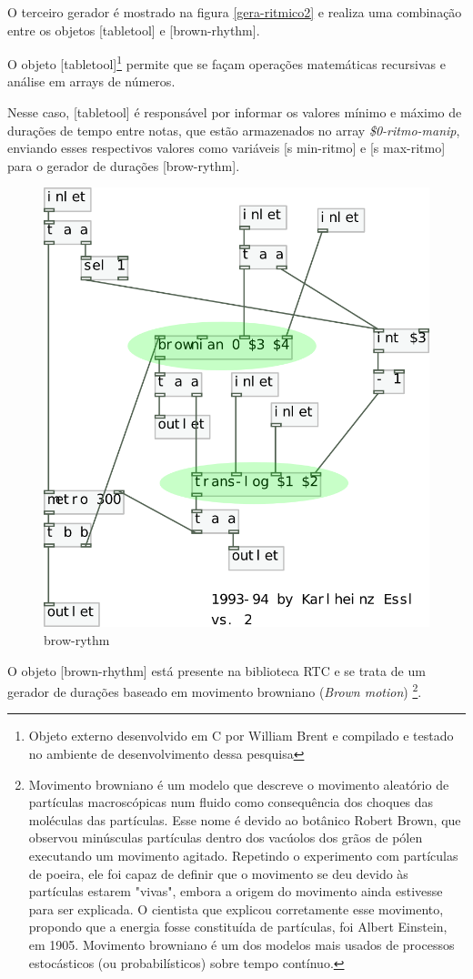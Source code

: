 \documentclass{ppgmus}
\begin{document}
O terceiro gerador é mostrado na figura \ref{gera-ritmico2} e
realiza uma combinação entre os objetos [tabletool] e [brown-rhythm].

O objeto [tabletool]\footnote{ Objeto externo desenvolvido em C
por William Brent e compilado e testado no ambiente de desenvolvimento
dessa pesquisa} permite que se façam operações matemáticas
recursivas e análise em arrays de números. 

Nesse caso, [tabletool] é responsável por informar os valores
mínimo e máximo de durações de tempo entre notas, que estão
armazenados no array \textit{\$0-ritmo-manip}, enviando
esses respectivos valores como variáveis [s min-ritmo] e 
[s max-ritmo] para o gerador de durações [brow-rythm].


 \begin{figure}
\includegraphics[scale=.6]{brown-rythm}
\caption{brow-rythm}
\label{brown-rythm}
\end{figure}  

O objeto [brown-rhythm] está presente na biblioteca RTC e se trata de
um gerador de durações baseado em movimento browniano (\textit{Brown motion})
\footnote{ Movimento browniano é um modelo que descreve o movimento aleatório 
de partículas macroscópicas num fluido como consequência dos choques das 
moléculas das partículas. Esse nome é devido ao botânico Robert
Brown, que observou minúsculas partículas dentro dos vacúolos dos grãos de 
pólen executando um movimento agitado. Repetindo o experimento com partículas de poeira, 
ele foi capaz de definir que o movimento se deu devido às partículas estarem "vivas", 
embora a origem do movimento ainda estivesse para ser explicada.
O cientista que explicou corretamente esse movimento, propondo que a energia fosse 
constituída de partículas, foi Albert Einstein, em 1905.
Movimento browniano é um dos modelos mais usados de processos estocásticos
(ou probabilísticos) sobre tempo contínuo.}.
\end{document}
